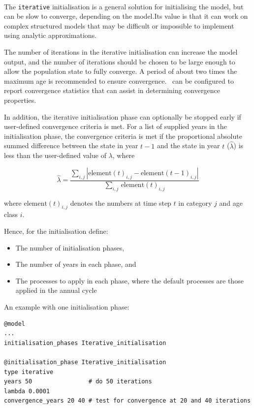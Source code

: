 \paragraph{}\label{sec:InitialisationPhase-Iterative}

The \texttt{iterative} initialisation is a general solution for initialising the model, but can be slow to converge, depending on the model.Its value is that it can work on complex structured models that may be difficult or impossible to implement using analytic approximations.

The number of iterations in the iterative initialisation can increase the model output, and the number of iterations should be chosen to be large enough to allow the population state to fully converge. A period of about two times the maximum age is recommended to ensure convergence. \CNAME\ can be configured to report convergence statistics that can assist in determining convergence properties.

In addition, the iterative initialisation phase can optionally be stopped early if user-defined convergence criteria is met. For a list of supplied years in the initialisation phase, the convergence criteria is met if the proportional absolute summed difference between the state in year $t-1$ and the state in year $t$ ($\widehat{\lambda}$) is less than the user-defined value of $\lambda$, where

\begin{equation}
  \widehat{\lambda} = \frac{\sum\limits_{i,j}  \left|\text{element}(t)_{i,j} - \text{element}(t-1)_{i,j} \right|}{\sum\limits_{i,j} \frac{}{}\text{element}(t)_{i,j}}
\end{equation}

where $\text{element}(t)_{i,j}$ denotes the numbers at time step $t$ in category $j$ and age class $i$.

Hence, for the initialisation define:

\begin{itemize}
  \item The number of initialisation phases,
  \item The number of years in each phase, and
  \item The processes to apply in each phase, where the default processes are those applied in the annual cycle
\end{itemize}

An example with one initialisation phase:

{\small{\begin{verbatim}
@model
...
initialisation_phases Iterative_initialisation

@initialisation_phase Iterative_initialisation
type iterative
years 50                # do 50 iterations
lambda 0.0001
convergence_years 20 40 # test for convergence at 20 and 40 iterations
\end{verbatim}}}

